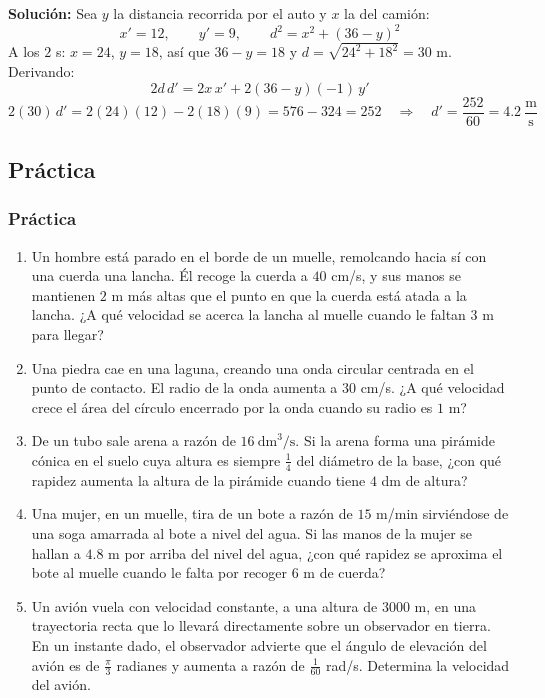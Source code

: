 \documentclass[12pt]{article}
\begin{document}
\textbf{Solución:} Sea $y$ la distancia recorrida por el auto y $x$ la del camión:
\[
x' = 12, \qquad y' = 9, \qquad d^2 = x^2 + (36 - y)^2
\]
A los $2$ s: $x = 24$, $y = 18$, así que $36 - y = 18$ y $d = \sqrt{24^2 + 18^2} = 30$ m. Derivando:
\[
2d\,d' = 2x\,x' + 2(36 - y)(-1)\,y'
\]
\[
2(30)\,d' = 2(24)(12) - 2(18)(9) = 576 - 324 = 252 \quad \Rightarrow \quad d' = \frac{252}{60} = 4.2\ \frac{\text{m}}{\text{s}}
\]



\subsection{Práctica}

\subsubsection{Práctica}


\begin{enumerate}
    \item Un hombre está parado en el borde de un muelle, remolcando hacia sí con una cuerda una lancha. Él recoge la cuerda a $40$ cm/s, y sus manos se mantienen $2$ m más altas que el punto en que la cuerda está atada a la lancha. ¿A qué velocidad se acerca la lancha al muelle cuando le faltan $3$ m para llegar?
    \item Una piedra cae en una laguna, creando una onda circular centrada en el punto de contacto. El radio de la onda aumenta a $30$ cm/s. ¿A qué velocidad crece el área del círculo encerrado por la onda cuando su radio es $1$ m?
    \item De un tubo sale arena a razón de $16\ \text{dm}^3/\text{s}$. Si la arena forma una pirámide cónica en el suelo cuya altura es siempre $\frac{1}{4}$ del diámetro de la base, ¿con qué rapidez aumenta la altura de la pirámide cuando tiene $4$ dm de altura?
    \item Una mujer, en un muelle, tira de un bote a razón de $15$ m/min sirviéndose de una soga amarrada al bote a nivel del agua. Si las manos de la mujer se hallan a $4.8$ m por arriba del nivel del agua, ¿con qué rapidez se aproxima el bote al muelle cuando le falta por recoger $6$ m de cuerda?
    \item Un avión vuela con velocidad constante, a una altura de $3000$ m, en una trayectoria recta que lo llevará directamente sobre un observador en tierra. En un instante dado, el observador advierte que el ángulo de elevación del avión es de $\frac{\pi}{3}$ radianes y aumenta a razón de $\frac{1}{60}$ rad/s. Determina la velocidad del avión.
\end{enumerate}
\end{document}
